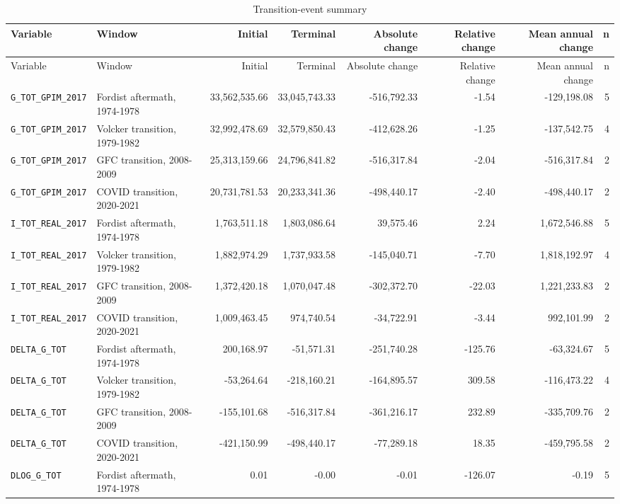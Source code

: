 \begin{landscape}
\begin{longtable}{p{3.4cm}p{3.2cm}rrrrrr}
\caption{Transition-event summary}\\
\toprule
Variable & Window & Initial & Terminal & Absolute change & Relative change & Mean annual change & n\\
\midrule
\endfirsthead
\toprule
Variable & Window & Initial & Terminal & Absolute change & Relative change & Mean annual change & n\\
\midrule
\endhead
\nolinkurl{G_TOT_GPIM_2017} & Fordist aftermath, 1974-1978 & 33,562,535.66 & 33,045,743.33 & -516,792.33 & -1.54 & -129,198.08 & 5
\\
\nolinkurl{G_TOT_GPIM_2017} & Volcker transition, 1979-1982 & 32,992,478.69 & 32,579,850.43 & -412,628.26 & -1.25 & -137,542.75 & 4
\\
\nolinkurl{G_TOT_GPIM_2017} & GFC transition, 2008-2009 & 25,313,159.66 & 24,796,841.82 & -516,317.84 & -2.04 & -516,317.84 & 2
\\
\nolinkurl{G_TOT_GPIM_2017} & COVID transition, 2020-2021 & 20,731,781.53 & 20,233,341.36 & -498,440.17 & -2.40 & -498,440.17 & 2
\\
\nolinkurl{I_TOT_REAL_2017} & Fordist aftermath, 1974-1978 & 1,763,511.18 & 1,803,086.64 & 39,575.46 & 2.24 & 1,672,546.88 & 5
\\
\nolinkurl{I_TOT_REAL_2017} & Volcker transition, 1979-1982 & 1,882,974.29 & 1,737,933.58 & -145,040.71 & -7.70 & 1,818,192.97 & 4
\\
\nolinkurl{I_TOT_REAL_2017} & GFC transition, 2008-2009 & 1,372,420.18 & 1,070,047.48 & -302,372.70 & -22.03 & 1,221,233.83 & 2
\\
\nolinkurl{I_TOT_REAL_2017} & COVID transition, 2020-2021 & 1,009,463.45 & 974,740.54 & -34,722.91 & -3.44 & 992,101.99 & 2
\\
\nolinkurl{DELTA_G_TOT} & Fordist aftermath, 1974-1978 & 200,168.97 & -51,571.31 & -251,740.28 & -125.76 & -63,324.67 & 5
\\
\nolinkurl{DELTA_G_TOT} & Volcker transition, 1979-1982 & -53,264.64 & -218,160.21 & -164,895.57 & 309.58 & -116,473.22 & 4
\\
\nolinkurl{DELTA_G_TOT} & GFC transition, 2008-2009 & -155,101.68 & -516,317.84 & -361,216.17 & 232.89 & -335,709.76 & 2
\\
\nolinkurl{DELTA_G_TOT} & COVID transition, 2020-2021 & -421,150.99 & -498,440.17 & -77,289.18 & 18.35 & -459,795.58 & 2
\\
\nolinkurl{DLOG_G_TOT} & Fordist aftermath, 1974-1978 & 0.01 & -0.00 & -0.01 & -126.07 & -0.19 & 5

\end{longtable}
\end{landscape}
